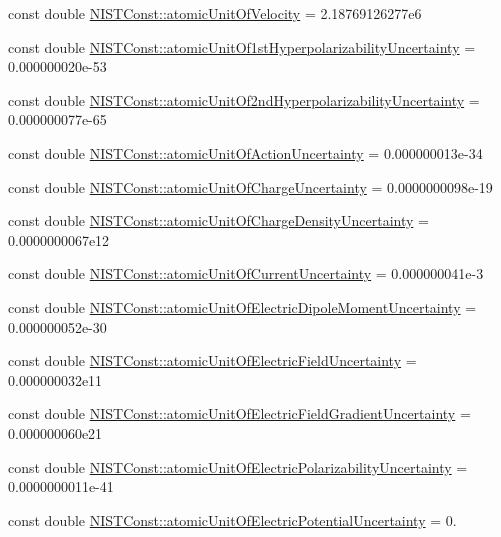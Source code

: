 \begin{DoxyCompactItemize}
\item 
const double \hyperlink{group___n_i_s_t_const-_atomic_unit_gaf22e630a5412176c4d94dbc8b1e36f70}{N\+I\+S\+T\+Const\+::atomic\+Unit\+Of\+Velocity} = 2.\+18769126277e6
\item 
const double \hyperlink{group___n_i_s_t_const-_atomic_unit_ga6763b09c4e925292e6a3a22b93a53abd}{N\+I\+S\+T\+Const\+::atomic\+Unit\+Of1st\+Hyperpolarizability\+Uncertainty} = 0.\+000000020e-\/53
\item 
const double \hyperlink{group___n_i_s_t_const-_atomic_unit_ga0977fcc84fb0f3d50f77493053fba633}{N\+I\+S\+T\+Const\+::atomic\+Unit\+Of2nd\+Hyperpolarizability\+Uncertainty} = 0.\+000000077e-\/65
\item 
const double \hyperlink{group___n_i_s_t_const-_atomic_unit_ga23528f5eb51ef25537027bf44e12663c}{N\+I\+S\+T\+Const\+::atomic\+Unit\+Of\+Action\+Uncertainty} = 0.\+000000013e-\/34
\item 
const double \hyperlink{group___n_i_s_t_const-_atomic_unit_ga681051e6abc6de4aaa406fd9e6904730}{N\+I\+S\+T\+Const\+::atomic\+Unit\+Of\+Charge\+Uncertainty} = 0.\+0000000098e-\/19
\item 
const double \hyperlink{group___n_i_s_t_const-_atomic_unit_ga3038b11b5fde2681f59e7dbbe32a44ab}{N\+I\+S\+T\+Const\+::atomic\+Unit\+Of\+Charge\+Density\+Uncertainty} = 0.\+0000000067e12
\item 
const double \hyperlink{group___n_i_s_t_const-_atomic_unit_gaef0b7cef2d2f63889e17b26d37173d3d}{N\+I\+S\+T\+Const\+::atomic\+Unit\+Of\+Current\+Uncertainty} = 0.\+000000041e-\/3
\item 
const double \hyperlink{group___n_i_s_t_const-_atomic_unit_ga28f3032fb8b6493d0852db40efeaff9e}{N\+I\+S\+T\+Const\+::atomic\+Unit\+Of\+Electric\+Dipole\+Moment\+Uncertainty} = 0.\+000000052e-\/30
\item 
const double \hyperlink{group___n_i_s_t_const-_atomic_unit_ga12048ba2381ea4da6842027fd918b6d0}{N\+I\+S\+T\+Const\+::atomic\+Unit\+Of\+Electric\+Field\+Uncertainty} = 0.\+000000032e11
\item 
const double \hyperlink{group___n_i_s_t_const-_atomic_unit_gab460c44de9b3fd957cd959cce3545631}{N\+I\+S\+T\+Const\+::atomic\+Unit\+Of\+Electric\+Field\+Gradient\+Uncertainty} = 0.\+000000060e21
\item 
const double \hyperlink{group___n_i_s_t_const-_atomic_unit_ga2ef1ea59315d53669e7c5e38fc4dc6b7}{N\+I\+S\+T\+Const\+::atomic\+Unit\+Of\+Electric\+Polarizability\+Uncertainty} = 0.\+0000000011e-\/41
\item 
const double \hyperlink{group___n_i_s_t_const-_atomic_unit_ga8cf4868d1230d8d02c6d7af0eccc1d24}{N\+I\+S\+T\+Const\+::atomic\+Unit\+Of\+Electric\+Potential\+Uncertainty} = 0.

\end{DoxyCompactItemize}
